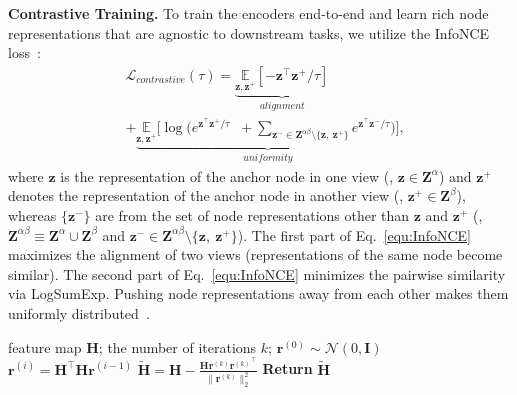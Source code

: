 \vspace{0.1cm}
\noindent\textbf{Contrastive Training.}
To train the encoders end-to-end and learn rich node
 representations that are agnostic to downstream tasks, we utilize the InfoNCE loss~\cite{chen2020simple}: %
\begin{equation}
\label{equ:InfoNCE}
\begin{aligned}
&\mathcal{L}_{contrastive}(\tau)=\underbrace{\underset{\mathbf{z}, \mathbf{z}^{+}}{\mathbb{E}}\left[-\mathbf{z}^{\top} \mathbf{z}^{+}/\tau \right]}_{alignment}\\
&+ \underbrace{\underset{\mathbf{z}, \mathbf{z}^{+} %
}{\mathbb{E}}\Big[\log \Big(e^{{\mathbf{z}^\top\mathbf{z}^{+}}/{\tau}} \;\;+ \!\!\!\!\!\!\!\!\sum_{\mathbf{z}^{-} \in \mathbf{Z}^{\alpha\beta} \setminus \{\mathbf{z}, \
\mathbf{z}^{+}\}} \!\!\!\!\!\!\!\! e^{{\mathbf{z}^\top\mathbf{z}^{-}}/{\tau}}\Big)\Big]}_{uniformity},
\end{aligned}
\end{equation}
where $\mathbf{z}$ is the representation
of the anchor node in one view (\ie, $\mathbf{z} \in \mathbf{Z}^{\alpha}$) and $\mathbf{z}^{+}$ denotes the representation of the anchor node in another view (\ie,  $\mathbf{z}^{+} \in \mathbf{Z}^{\beta}$), whereas $\{\mathbf{z}^{-}\}$ are from the set of node representations other than $\mathbf{z}$ and $\mathbf{z}^{+}$ (\ie, $\mathbf{Z}^{\alpha\beta}\!\equiv\mathbf{Z}^\alpha \cup \mathbf{Z}^\beta$ and $\mathbf{z}^{-} \!\in \mathbf{Z}^{\alpha\beta}\setminus \{\mathbf{z}, \
\mathbf{z}^{+}\}$). The first part of  Eq.~\eqref{equ:InfoNCE} maximizes the alignment of two  views (representations of the same node become similar). The second part of  Eq.~\eqref{equ:InfoNCE} minimizes the pairwise similarity via LogSumExp. Pushing node representations away from each other  makes them uniformly distributed~\cite{wang2020understanding}. 
\begin{algorithm}[t]
   \caption{Spectral Feature Augmentation ($\mathcal{A}_{F^*}$)}
\begin{algorithmic}
   \STATE {\bfseries Input:} feature map $\mathbf{H}$; the number of iterations $k$;
   \STATE $\mathbf{r}^{(0)} \sim \mathcal{N}(0, \mathbf{I})$
   \STATE $\mathbf{r}^{(i)} = \mathbf{H}^\top \mathbf{H} \mathbf{r}^{(i-1)}$
   \ENDFOR
   \STATE $\widetilde{\mathbf{H}} = \mathbf{H} -  \frac{\mathbf{H} \mathbf{r}^{(k)} {\mathbf{r}^{(k)}}^{\top}}{\|\mathbf{r}^{(k)}\|_2^2}$ %
\STATE \textbf{Return} $\widetilde{\mathbf{H}}$
\end{algorithmic}
\label{algo:1}
\end{algorithm}
%

